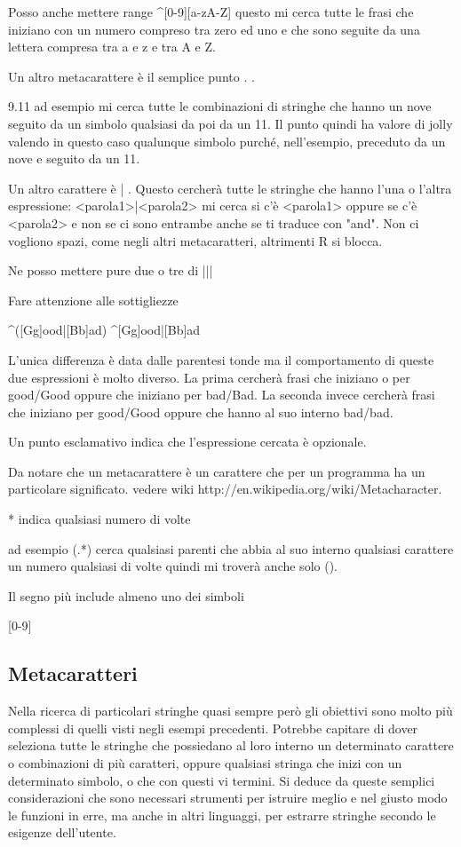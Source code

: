 Posso anche mettere range
^[0-9][a-zA-Z]  questo mi cerca tutte le frasi che iniziano con un numero compreso tra zero ed uno e che sono seguite da una lettera compresa tra a e z e tra A e Z.

Un altro metacarattere è il semplice punto . .

	9.11 ad esempio mi cerca tutte le combinazioni di stringhe che hanno un nove seguito da un simbolo qualsiasi da poi da un 11. Il punto quindi ha valore di jolly valendo in questo caso qualunque simbolo purché, nell'esempio, preceduto da un nove e seguito da un 11.

Un altro carattere è | . Questo cercherà tutte le stringhe che hanno l'una o l'altra espressione:  <parola1>|<parola2> mi cerca si c'è <parola1> oppure se c'è <parola2> e non se ci sono entrambe anche se ti traduce con "and". Non ci vogliono spazi, come negli altri metacaratteri, altrimenti R si blocca.

Ne posso mettere pure due o tre di  |||


Fare attenzione alle sottigliezze 

^([Gg]ood|[Bb]ad)
^[Gg]ood|[Bb]ad

L'unica differenza è data dalle parentesi tonde ma il comportamento di queste due espressioni è molto diverso. La prima cercherà frasi che iniziano o per good/Good oppure che iniziano per bad/Bad. La seconda invece cercherà frasi che iniziano per good/Good oppure che hanno al suo interno bad/bad.

Un punto esclamativo indica che l'espressione cercata è opzionale.

Da notare che un metacarattere è un carattere che per un programma ha un particolare significato. vedere wiki http://en.wikipedia.org/wiki/Metacharacter.


* indica qualsiasi numero di volte

ad esempio (.*) cerca qualsiasi parenti che abbia al suo interno qualsiasi carattere un numero qualsiasi di volte quindi mi troverà anche solo ().

Il segno più include almeno uno dei simboli

[0-9]

\subsection{Metacaratteri}

Nella ricerca di particolari stringhe quasi sempre però gli obiettivi sono molto più complessi di quelli visti negli esempi precedenti. Potrebbe capitare di dover seleziona tutte le stringhe che possiedano al loro interno un determinato carattere o combinazioni di più caratteri, oppure qualsiasi stringa che inizi con un determinato simbolo, o che con questi vi termini. Si deduce da queste semplici considerazioni che sono necessari strumenti per istruire meglio e nel giusto modo le funzioni in erre, ma anche in altri linguaggi, per estrarre stringhe secondo le esigenze dell’utente.


